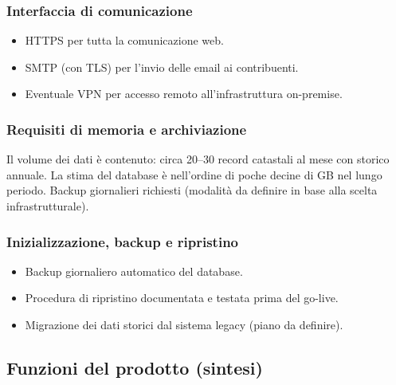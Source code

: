 \documentclass[12pt, a4paper]{article}
\begin{document}
\subsubsection{Interfaccia di comunicazione}

\begin{itemize}
  \item HTTPS per tutta la comunicazione web.
  \item SMTP (con TLS) per l'invio delle email ai contribuenti.
  \item Eventuale VPN per accesso remoto all'infrastruttura on-premise.
\end{itemize}

\subsubsection{Requisiti di memoria e archiviazione}

Il volume dei dati è contenuto: circa 20--30 record catastali al mese con storico annuale.
La stima del database è nell'ordine di poche decine di GB nel lungo periodo.
Backup giornalieri richiesti (modalità da definire in base alla scelta infrastrutturale).

\subsubsection{Inizializzazione, backup e ripristino}

\begin{itemize}
  \item Backup giornaliero automatico del database.
  \item Procedura di ripristino documentata e testata prima del go-live.
  \item Migrazione dei dati storici dal sistema legacy (piano da definire).
\end{itemize}

\subsection{Funzioni del prodotto (sintesi)}
\end{document}

